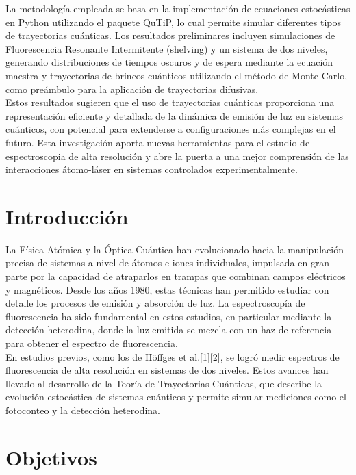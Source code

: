 \documentclass[12pt]{report}
\begin{document}
La metodología empleada se basa en la implementación de ecuaciones estocásticas en Python utilizando el paquete QuTiP, lo cual permite simular diferentes tipos de trayectorias cuánticas. Los resultados preliminares incluyen simulaciones de Fluorescencia Resonante Intermitente (shelving) y un sistema de dos niveles, generando distribuciones de tiempos oscuros y de espera mediante la ecuación maestra y trayectorias de brincos cuánticos utilizando el método de Monte Carlo, como preámbulo para la aplicación de trayectorias difusivas.\\

Estos resultados sugieren que el uso de trayectorias cuánticas proporciona una representación eficiente y detallada de la dinámica de emisión de luz en sistemas cuánticos, con potencial para extenderse a configuraciones más complejas en el futuro. Esta investigación aporta nuevas herramientas para el estudio de espectroscopia de alta resolución y abre la puerta a una mejor comprensión de las interacciones átomo-láser en sistemas controlados experimentalmente.




\section*{Introducción}

La Física Atómica y la Óptica Cuántica han evolucionado hacia la manipulación precisa de sistemas a nivel de átomos e iones individuales, impulsada en gran parte por la capacidad de atraparlos en trampas que combinan campos eléctricos y magnéticos. Desde los años 1980, estas técnicas han permitido estudiar con detalle los procesos de emisión y absorción de luz. La espectroscopía de fluorescencia ha sido fundamental en estos estudios, en particular mediante la detección heterodina, donde la luz emitida se mezcla con un haz de referencia para obtener el espectro de fluorescencia.\\

En estudios previos, como los de Höffges et al.[1][2], se logró medir espectros de fluorescencia de alta resolución en sistemas de dos niveles. Estos avances han llevado al desarrollo de la Teoría de Trayectorias Cuánticas, que describe la evolución estocástica de sistemas cuánticos y permite simular mediciones como el fotoconteo y la detección heterodina.


\section*{Objetivos}
\end{document}
